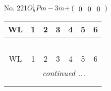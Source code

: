 \documentclass[fleqn,9pt,landscape]{jsarticle}
\begin{document}
\newpage
No. 221\quad$O_{h}^{1}$\quad$Pm-3m$\quad[ cubic ]\quad$+\begin{pmatrix} 0 & 0 & 0 \end{pmatrix}$
\begin{center}
\renewcommand{\arraystretch}{1.2}
\begin{longtable}{ccccccc}
 \hline \hline
WL & 1 & 2 & 3 & 4 & 5 & 6 \\ \hline \endfirsthead

\multicolumn{6}{l}{\tablename\ \thetable{}} \\
 \hline \hline
WL & 1 & 2 & 3 & 4 & 5 & 6 \\ \hline \endhead

 \hline \hline
\multicolumn{6}{r}{\footnotesize\it continued ...} \\ \endfoot

 \hline \hline
\multicolumn{6}{r}{} \\ \endlastfoot


\end{longtable}
\end{center}
\end{document}
